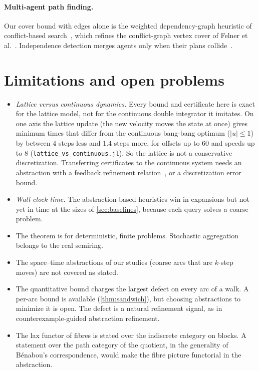 \documentclass[11pt]{article}
\theoremstyle{definition}
\theoremstyle{remark}
\begin{document}
\paragraph{Multi-agent path finding.}
Our cover bound with edges alone is the weighted dependency-graph heuristic of
conflict-based search~\cite{sharon2015,li2019}, which refines the conflict-graph
vertex cover of Felner et al.~\cite{felner2018}. Independence detection merges
agents only when their plans collide~\cite{standley2010}.

\section{Limitations and open problems}
\begin{itemize}
\item \emph{Lattice versus continuous dynamics.} Every bound and certificate here is
  exact for the lattice model, not for the continuous double integrator it
  imitates. On one axis the lattice update (the new velocity moves the state at
  once) gives minimum times that differ from the continuous bang-bang optimum
  ($|u| \le 1$) by between $4$ steps less and $1.4$ steps more, for offsets up to
  $60$ and speeds up to $8$ (\texttt{lattice\_vs\_continuous.jl}). So the lattice is
  not a conservative discretization. Transferring certificates to the continuous
  system needs an abstraction with a feedback refinement
  relation~\cite{reissig2017}, or a discretization error bound.
\item \emph{Wall-clock time.} The abstraction-based heuristics win in expansions but
  not yet in time at the sizes of \cref{sec:baselines}, because each query solves
  a coarse problem.

\item The theorem is for deterministic, finite problems. Stochastic aggregation
  belongs to the real semiring.
\item The space--time abstractions of our studies (coarse arcs that are $k$-step
  moves) are not covered as stated.
\item The quantitative bound charges the largest defect on every arc of a walk. A
  per-arc bound is available (\cref{thm:sandwich}), but choosing abstractions to
  minimize it is open. The defect is a natural refinement signal, as in
  counterexample-guided abstraction refinement.
\item The lax functor of fibres is stated over the indiscrete category on blocks. A
  statement over the path category of the quotient, in the generality of
  Bénabou's correspondence, would make the fibre picture functorial in the
  abstraction.
\end{itemize}



\end{document}
